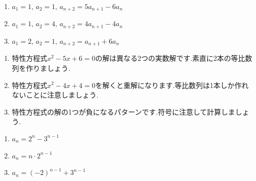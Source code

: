     \noindent {}
    \begin{enumerate}[label=(\arabic*),parsep=3pt,format=\bookitemlink{example-three-term-1}{problem}{answer}]
      \item $\displaystyle a_1=1,\,a_2=1,\, a_{n+2}=5a_{n+1}-6a_n$
      \item $\displaystyle a_1=1,\,a_2=4,\, a_{n+2}=4a_{n+1}-4a_n$
      \item $\displaystyle a_1=2,\,a_2=1,\, a_{n+2}=a_{n+1}+6a_n$
    \end{enumerate}

    \noindent{}
    \begin{enumerate}[label=(\arabic*),parsep=3pt,format=\bookitemlink{example-three-term-1}{hint}{problem}]
      \item 特性方程式$x^2-5x+6=0$の解は異なる2つの実数解です.素直に2本の等比数列を作りましょう.
      \item 特性方程式$x^2-4x+4=0$を解くと重解になります.等比数列は1本しか作れないことに注意しましょう.
      \item 特性方程式の解の1つが負になるパターンです.符号に注意して計算しましょう.
    \end{enumerate}

    \noindent{}
    \begin{enumerate}[label=(\arabic*),parsep=3pt,format=\bookitemlink{example-three-term-1}{answer}{problem}]
      \item $\displaystyle a_n=2^n-3^{n-1}$
      \item $\displaystyle a_n=n\cdot2^{n-1}$
      \item $\displaystyle a_n=(-2)^{n-1}+3^{n-1}$
    \end{enumerate}

